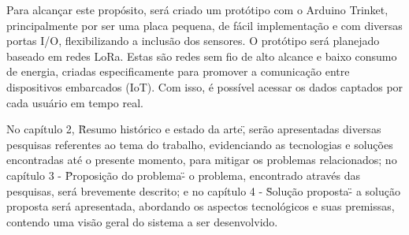 Para alcançar este propósito, será criado um protótipo com o Arduino Trinket, principalmente 
por ser uma placa pequena, de fácil implementação e com diversas portas I/O, flexibilizando 
a inclusão dos sensores. O protótipo será planejado baseado em redes LoRa. Estas são redes 
sem fio de alto alcance e baixo consumo de energia, criadas especificamente para promover a 
comunicação entre dispositivos embarcados (IoT). Com isso, é possível acessar os dados 
captados por cada usuário em tempo real.

No capítulo 2, \"Resumo histórico e estado da arte\", serão apresentadas diversas pesquisas 
referentes ao tema do trabalho, evidenciando as tecnologias e soluções encontradas até o 
presente momento, para mitigar os problemas relacionados; no capítulo 3 - \"Proposição do 
problema\" - o problema, encontrado através das pesquisas, será brevemente descrito; e no 
capítulo 4 - \"Solução proposta\" - a solução proposta será apresentada, abordando os 
aspectos tecnológicos e suas premissas, contendo uma visão geral do sistema a ser 
desenvolvido.